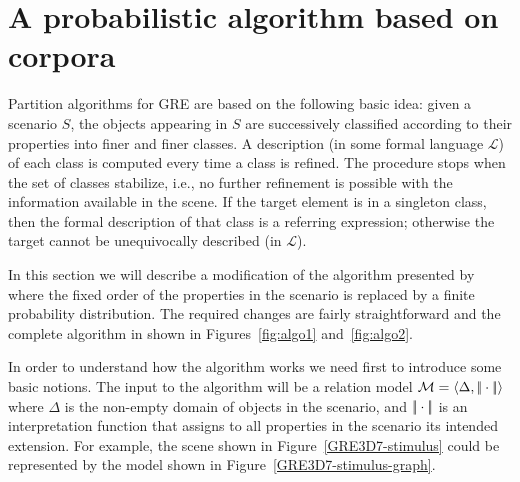 \section{A probabilistic algorithm based on corpora} \label{sec:algorithm}

Partition algorithms for GRE are based on the following basic idea: given a 
scenario $S$, the objects appearing in $S$ are successively classified according
to their properties into finer and finer classes. A description (in some formal language $\mathcal{L}$) of each 
class is computed every time a class is refined.   The procedure stops when the 
set of classes stabilize, i.e., no further refinement is possible with the information 
available in the scene.  If the target element is in a singleton class, then 
the formal description of that class is a referring expression; otherwise the 
target cannot be unequivocally described (in $\mathcal{L}$).  

In this section we will describe a modification of the algorithm presented 
by~\cite{arec2:2008:Areces} where the fixed order of the properties in the 
scenario is replaced by a finite probability distribution.  The required changes
are fairly straightforward and the complete algorithm in shown in Figures~\ref{fig:algo1} and~\ref{fig:algo2}. 

In order to understand how the algorithm works we need first to introduce some 
basic notions.  The input to the algorithm will be a relation model $\mathcal{M} = \langle \Delta, |\!|\cdot|\!| \rangle$
where $\Delta$ is the non-empty domain of objects in the scenario, and $|\!|\cdot|\!|$ is an 
interpretation function that assigns to all properties in the scenario its intended extension.  For example, 
the scene shown in Figure~\ref{GRE3D7-stimulus} could be represented by the model shown in Figure~\ref{GRE3D7-stimulus-graph}.

\newcommand{\nBlue}{\mathit{blue}\xspace}
\newcommand{\nGreen}{\mathit{green}\xspace}
\newcommand{\nSmall}{\mathit{small}\xspace}
\newcommand{\nBig}{\mathit{big}\xspace}
\newcommand{\nBall}{\mathit{ball}\xspace}
\newcommand{\nCube}{\mathit{cube}\xspace}
\newcommand{\nOntop}{\mathit{ontop}\xspace}
\newcommand{\nBelow}{\mathit{below}\xspace}
\newcommand{\nRightof}{\mathit{rightof}\xspace}
\newcommand{\nLeftof}{\mathit{leftof}\xspace}

